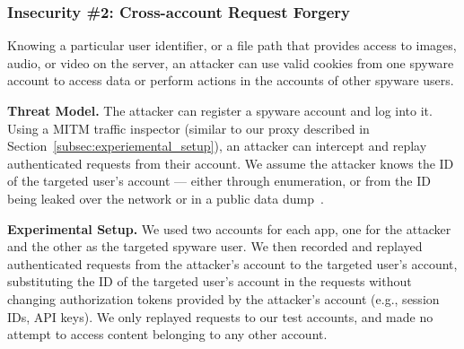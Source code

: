 
\subsubsection*{Insecurity \#2: Cross-account Request Forgery}

Knowing a particular user identifier, or a file path that provides access to images, audio, or video on the server, an attacker can use valid
cookies from one spyware account to access data or perform actions in
the accounts of other spyware users.

\textbf{Threat Model.} The attacker can register a spyware account and
log into it. Using a MITM traffic inspector (similar to our proxy
described in Section~\ref{subsec:experiemental_setup}), an attacker
can intercept and replay authenticated requests from their account. We
assume the attacker knows the ID of the targeted user's account ---
either through enumeration, or from the ID being leaked over the
network or in a public data dump~\cite{mSpybrea38:online,
  Companyt8:online, HackerSt66:online, Cerberus12:online,
  Stalkerw59:online}.


\textbf{Experimental Setup.} We used two accounts for each app, one
for the attacker and the other as the targeted spyware user.  We then
recorded and replayed authenticated requests from the attacker's
account to the targeted user's account, substituting the ID of the
targeted user's account in the requests without changing authorization
tokens provided by the attacker's account (e.g., session IDs, API
keys).  We only replayed requests to our test accounts, and
made no attempt to access content belonging to any other account.

